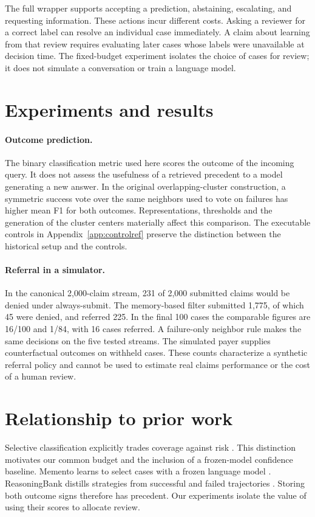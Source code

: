 \documentclass[11pt,letterpaper]{article}
\begin{document}
The full wrapper supports accepting a prediction, abstaining, escalating,
and requesting information. These actions incur different costs. Asking a
reviewer for a correct label can resolve an individual case immediately.
A claim about learning from that review requires evaluating later cases whose
labels were unavailable at decision time. The fixed-budget experiment isolates
the choice of cases for review; it does not simulate a conversation or train
a language model.

\section{Experiments and results}

\paragraph{Outcome prediction.}
The binary classification metric used here scores the outcome of the incoming
query. It does not assess the usefulness of a retrieved precedent to a model
generating a new answer. In the original overlapping-cluster construction,
a symmetric success vote over the same neighbors used to vote on failures
has higher mean F1 for both outcomes. Representations, thresholds
and the generation of the cluster centers materially affect this comparison.
The executable controls in Appendix~\ref{app:controlref} preserve the
distinction between the historical setup and the controls.

\paragraph{Referral in a simulator.}
In the canonical 2,000-claim stream, 231 of 2,000 submitted claims would be
denied under always-submit. The memory-based filter submitted 1,775, of which
45 were denied, and referred 225. In the final 100 cases the comparable
figures are 16/100 and 1/84, with 16 cases referred. A failure-only
neighbor rule makes the same decisions on the five tested streams.
The simulated payer supplies counterfactual outcomes on withheld cases.
These counts characterize a synthetic referral policy and cannot be
used to estimate real claims performance or the cost of a human review.

\section{Relationship to prior work}
Selective classification explicitly trades coverage against risk
\citep{selective}. This distinction motivates our common budget and the
inclusion of a frozen-model confidence baseline. Memento learns to select
cases with a frozen language model \citep{memento}. ReasoningBank distills
strategies from successful and failed trajectories \citep{reasoningbank}.
Storing both outcome signs therefore has precedent. Our experiments isolate
the value of using their scores to allocate review.
\end{document}
